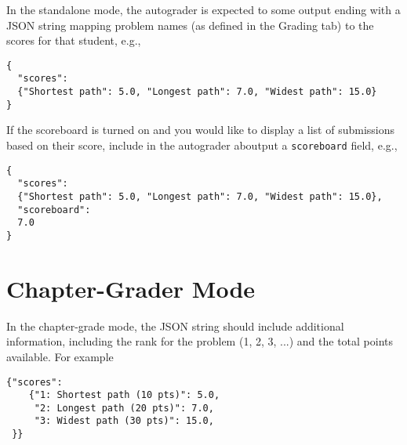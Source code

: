 \begin{gram}
\label{sec:codelabs::standalone::output}

In the standalone mode, the autograder is expected to some output ending with a JSON string mapping problem names (as defined in the Grading tab) to the scores for that student, e.g.,
  
\begin{lstlisting}
{
  "scores":
  {"Shortest path": 5.0, "Longest path": 7.0, "Widest path": 15.0}
}
\end{lstlisting}

If the scoreboard is turned on and you would like to display a list of
submissions based on their score, include in the autograder aboutput a \lstinline`scoreboard` field, e.g.,


\begin{lstlisting}
{
  "scores":
  {"Shortest path": 5.0, "Longest path": 7.0, "Widest path": 15.0},
  "scoreboard": 
  7.0  
}
\end{lstlisting}
  
\end{gram}


\section{Chapter-Grader Mode}
\label{sec:codelabs::chapter}

\begin{gram}
\label{sec:codelabs::chapter::output}
  
In the chapter-grade mode, the JSON string should include additional information, including the rank for the problem (1, 2, 3, ...) and the total points available.  For example

\begin{lstlisting}
{"scores":
    {"1: Shortest path (10 pts)": 5.0,
     "2: Longest path (20 pts)": 7.0,
     "3: Widest path (30 pts)": 15.0,
 }}
\end{lstlisting}
\end{gram}
